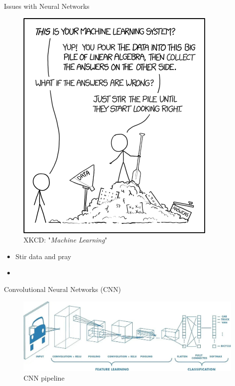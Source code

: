 \documentclass{beamer}
\begin{document}
\begin{frame}{Issues with Neural Networks}
	\begin{multicols}{2}
		\begin{figure}
			\includegraphics[width=.4\textwidth]{../Images/xkcd_machine_learning.png}
			\caption{XKCD: "\textit{Machine Learning}" \cite{xkcd-ml}}
		\end{figure}
		
		\columnbreak
		
		\null \vfill
		\begin{itemize}
			\item Stir data and pray
			\item 
		\end{itemize}
		\vfill \null
	\end{multicols}
\end{frame}

\begin{frame}{Convolutional Neural Networks (CNN)}
	\begin{figure}
		\includegraphics[width=.8\textwidth]{../Images/big-pic-cnn.jpg}
		\caption{CNN pipeline \cite{eli5CNN}}
	\end{figure}
\end{frame}
\end{document}
